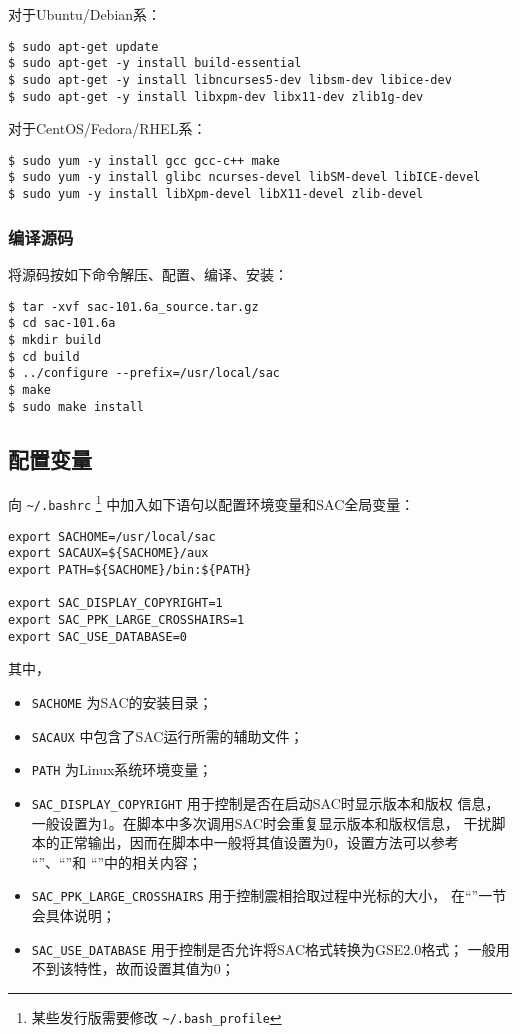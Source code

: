 对于Ubuntu/Debian系：
\begin{verbatim}
$ sudo apt-get update
$ sudo apt-get -y install build-essential
$ sudo apt-get -y install libncurses5-dev libsm-dev libice-dev
$ sudo apt-get -y install libxpm-dev libx11-dev zlib1g-dev
\end{verbatim}

对于CentOS/Fedora/RHEL系：
\begin{verbatim}
$ sudo yum -y install gcc gcc-c++ make
$ sudo yum -y install glibc ncurses-devel libSM-devel libICE-devel
$ sudo yum -y install libXpm-devel libX11-devel zlib-devel
\end{verbatim}

\subsubsection{编译源码}
将源码按如下命令解压、配置、编译、安装：
\begin{verbatim}
$ tar -xvf sac-101.6a_source.tar.gz
$ cd sac-101.6a
$ mkdir build
$ cd build
$ ../configure --prefix=/usr/local/sac
$ make
$ sudo make install
\end{verbatim}

\subsection{配置变量}
向 \verb|~/.bashrc| \footnote{某些发行版需要修改 \verb|~/.bash_profile|}
中加入如下语句以配置环境变量和SAC全局变量：
\begin{verbatim}
export SACHOME=/usr/local/sac
export SACAUX=${SACHOME}/aux
export PATH=${SACHOME}/bin:${PATH}

export SAC_DISPLAY_COPYRIGHT=1
export SAC_PPK_LARGE_CROSSHAIRS=1
export SAC_USE_DATABASE=0
\end{verbatim}

其中，
\begin{itemize}
\item \texttt{SACHOME} 为SAC的安装目录；
\item \texttt{SACAUX} 中包含了SAC运行所需的辅助文件；
\item \texttt{PATH} 为Linux系统环境变量；
\item \verb|SAC_DISPLAY_COPYRIGHT| 用于控制是否在启动SAC时显示版本和版权
    信息，一般设置为1。在脚本中多次调用SAC时会重复显示版本和版权信息，
    干扰脚本的正常输出，因而在脚本中一般将其值设置为0，设置方法可以参考
    ``''、``''和
    ``''中的相关内容；
\item \verb|SAC_PPK_LARGE_CROSSHAIRS| 用于控制震相拾取过程中光标的大小，
    在``''一节会具体说明；
\item \verb|SAC_USE_DATABASE| 用于控制是否允许将SAC格式转换为GSE2.0格式；
    一般用不到该特性，故而设置其值为0；
\end{itemize}

